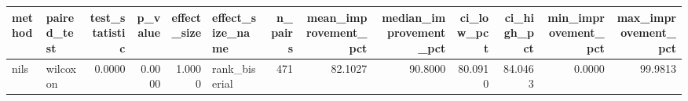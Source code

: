 \begin{tabular}{llrrrlrrrrrrr}
\toprule
method & paired_test & test_statistic & p_value & effect_size & effect_size_name & n_pairs & mean_improvement_pct & median_improvement_pct & ci_low_pct & ci_high_pct & min_improvement_pct & max_improvement_pct \\
\midrule
nils & wilcoxon & 0.0000 & 0.0000 & 1.0000 & rank_biserial & 471 & 82.1027 & 90.8000 & 80.0910 & 84.0463 & 0.0000 & 99.9813 \\
\bottomrule
\end{tabular}
